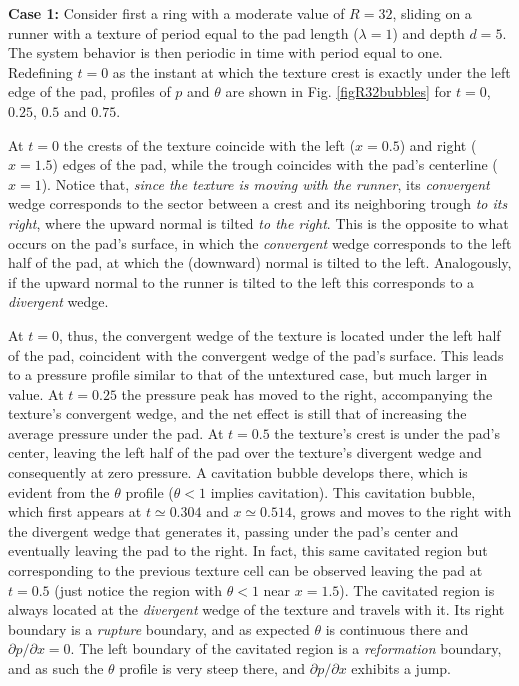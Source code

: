 {\bf Case 1:} Consider first a ring with a moderate value of $R=32$, sliding on a
runner with a texture of period equal to the pad length ($\lambda = 1$) and 
depth $d=5$. The system behavior is then periodic in time with period equal
to one. Redefining $t=0$ as the instant at which the texture crest is exactly
under the left edge of the pad, profiles of $p$ and $\theta$ are shown in
Fig. \ref{figR32bubbles} for $t=0$, $0.25$, $0.5$ and $0.75$. 

At $t=0$ the crests of the texture coincide with the left ($x=0.5$)
and right ($x=1.5$) edges of the pad, while the trough coincides
with the pad's centerline ($x=1$). Notice that, {\em since the texture
is moving with the runner}, 
its {\em convergent} wedge corresponds to the sector between a crest
and its neighboring trough {\em to its right}, where the upward
normal is tilted {\em to the right}. This is the opposite to what occurs
on the pad's surface, in which the {\em convergent} wedge corresponds
to the left half of the pad, at which the (downward) normal is tilted
to the left.
Analogously, if the upward normal
to the runner is tilted to the left this corresponds to a {\em divergent}
wedge.

At $t=0$, thus, the
convergent wedge of the texture is located under the left half
of the pad, coincident with the convergent wedge of the pad's surface.
This leads to a pressure profile similar to that of the
untextured case, but much larger in value. At $t=0.25$ the pressure
peak has moved to the right, accompanying the texture's convergent wedge,
and the net effect is still that of increasing the average pressure under the pad.
At $t=0.5$ the texture's crest is under the pad's center, leaving the
left half of the pad over the texture's divergent wedge and consequently
at zero pressure. A cavitation bubble develops
there, which is evident from the $\theta$ profile ($\theta < 1$ implies
cavitation). This cavitation bubble,
which first appears at $t\simeq 0.304$ and $x \simeq 0.514$,
grows and moves to the right with the divergent wedge that
generates it, passing under the pad's center and eventually leaving the pad to
the right. In fact, this same cavitated region but corresponding to the
previous texture cell can be observed leaving the pad at $t=0.5$ (just
notice the region with $\theta < 1$ near $x=1.5$).
The cavitated region is always located at the {\em divergent}
wedge of the texture and travels with it. Its right boundary is a
{\em rupture} boundary, and as expected $\theta$ is continuous there
and $\partial p/\partial x=0$. The left boundary of the cavitated region
is a {\em reformation} boundary, and as such the $\theta$ profile is
very steep there, and $\partial p/\partial x$ exhibits a jump. 

